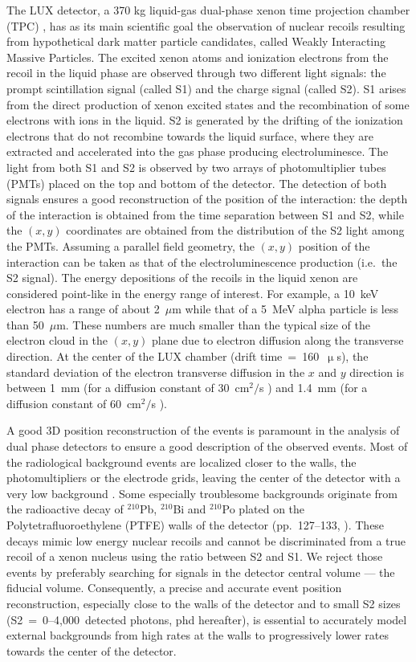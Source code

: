 \documentclass[a4paper,11pt]{article}
\begin{document}
The LUX detector, a 370 kg liquid-gas dual-phase xenon time projection chamber (TPC) \cite{LUX_2013NIM}, has as its main scientific goal the observation of nuclear recoils resulting from hypothetical dark matter particle candidates, called Weakly Interacting Massive Particles. The excited xenon atoms and ionization electrons from the recoil in the liquid phase are observed through two different light signals: the prompt scintillation signal (called S1) and the charge signal (called S2). S1 arises from the direct production of xenon excited states and the recombination of some electrons with ions in the liquid. S2 is generated by the drifting of the ionization electrons that do not recombine towards the liquid surface, where they are extracted and accelerated into the gas phase producing electroluminesce. The light from both S1 and S2  is observed by two arrays of photomultiplier tubes (PMTs) placed on the top and bottom of the detector. The detection of both signals ensures a good reconstruction of the position of the interaction: the depth of the interaction is obtained from the time separation between  S1 and S2, while the $(x, y)$ coordinates are obtained from the distribution of the S2 light among the PMTs.  Assuming a parallel field geometry, the $(x, y)$ position of the interaction can be taken as that of the electroluminescence production (i.e.\ the S2 signal). The energy depositions of the recoils in the liquid xenon are considered point-like in the energy range of interest. For example, a 10~keV electron has a range of about 2~$\mu$m while that of a 5~MeV alpha particle is less than 50~$\mu$m. These numbers are much smaller than the typical size of the electron cloud in the $(x,y)$ plane due to electron diffusion along the transverse direction. At the center of the LUX chamber (drift time~=~160~$\upmu$s), the standard deviation of the electron transverse diffusion in the $x$ and $y$ direction is between 1~mm (for a diffusion constant of 30~cm$^2/$s \cite{Chen2012}) and 1.4~mm (for a diffusion constant of 60~cm$^2/$s \cite{PhysRevC.95.025502}).

A good 3D position reconstruction of the events is paramount in the analysis of dual phase detectors to ensure a good description of the observed events. Most of the radiological background events are localized closer to the walls, the photomultipliers or the electrode grids, leaving the center of the detector with a very low background \cite{LUX2015_BackgroundPaper}. Some especially troublesome backgrounds originate from the radioactive decay of ${}^{210}$Pb, ${}^{210}$Bi and ${}^{210}$Po plated on the Polytetrafluoroethylene (PTFE) walls of the detector (pp.\ 127--133, \cite{ChangLeePhDThesis}). These decays mimic low energy nuclear recoils and cannot be discriminated from a true recoil of a xenon nucleus using the ratio between S2 and S1.  We reject those events by preferably searching for signals in the detector central volume --- the fiducial volume. Consequently, a precise and accurate event position reconstruction, especially close to the walls of the detector and to  small S2 sizes (S2~=~0--4,000~detected photons, phd hereafter), is essential to accurately model external backgrounds from high rates at the walls to progressively lower rates towards the center of the detector.
\end{document}

